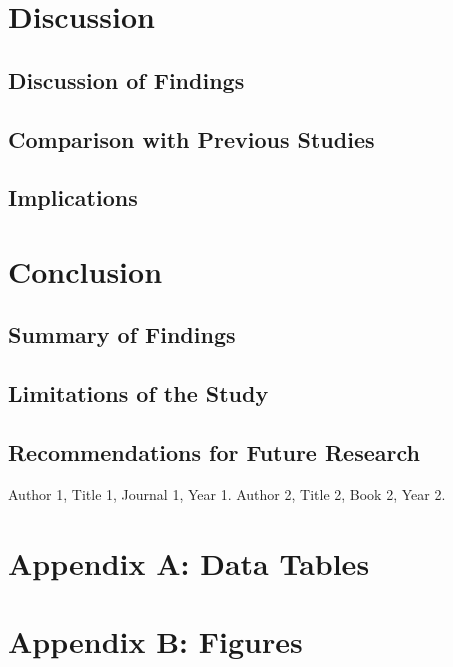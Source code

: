 \documentclass[12pt,a4paper]{report}
\begin{document}
\chapter{Discussion}
\label{chap:discussion}

\section{Discussion of Findings}
\label{sec:discussionfindings}
\lipsum[41-43]

\section{Comparison with Previous Studies}
\label{sec:comparison}
\lipsum[44-46]

\section{Implications}
\label{sec:implications}
\lipsum[47-49]

\chapter{Conclusion}
\label{chap:conclusion}

\section{Summary of Findings}
\label{sec:summary}
\lipsum[50-52]

\section{Limitations of the Study}
\label{sec:limitations}
\lipsum[53-55]

\section{Recommendations for Future Research}
\label{sec:recommendations}
\lipsum[56-58]

\begin{thebibliography}{99}
 Author 1, Title 1, Journal 1, Year 1.
 Author 2, Title 2, Book 2, Year 2.
\end{thebibliography}

\appendix

\chapter{Appendix A: Data Tables}
\label{app:data}
\lipsum[59-61]

\chapter{Appendix B: Figures}
\label{app:figures}
\lipsum[62-64]
\end{document}
